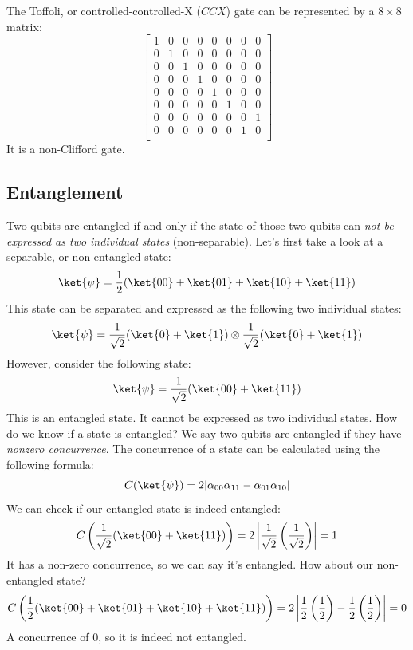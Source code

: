 \documentclass[11pt]{article}
\begin{document}
\newpage
\noindent
The Toffoli, or controlled-controlled-X ($CCX$) gate can be represented by a $8 \times 8$ matrix:
\[
  \begin{bmatrix}
  1 & 0 & 0 & 0 & 0 & 0 & 0 & 0\\
  0 & 1 & 0 & 0 & 0 & 0 & 0 & 0\\
  0 & 0 & 1 & 0 & 0 & 0 & 0 & 0\\
  0 & 0 & 0 & 1 & 0 & 0 & 0 & 0\\
  0 & 0 & 0 & 0 & 1 & 0 & 0 & 0\\
  0 & 0 & 0 & 0 & 0 & 1 & 0 & 0\\
  0 & 0 & 0 & 0 & 0 & 0 & 0 & 1\\
  0 & 0 & 0 & 0 & 0 & 0 & 1 & 0\\
  \end{bmatrix}
\]
It is a non-Clifford gate.

\subsection{Entanglement}
Two qubits are entangled if and only if the state of those two qubits can \emph{not be expressed as two individual states} (non-separable). Let's first take a look at a separable, or non-entangled state:
\[
  \ket{\psi} = \dfrac{1}{2}(\ket{00} + \ket{01} + \ket{10} + \ket{11})
\]
This state can be separated and expressed as the following two individual states:
\[
  \ket{\psi} = \dfrac{1}{\sqrt2}(\ket{0} + \ket{1}) \otimes \dfrac{1}{\sqrt2}(\ket{0} + \ket{1})
\]
However, consider the following state:
\[
  \ket{\psi} = \dfrac{1}{\sqrt2}(\ket{00} + \ket{11})
\]
This is an entangled state. It cannot be expressed as two individual states. How do we know if a state is entangled? We say two qubits are entangled if they have \emph{nonzero concurrence}. The concurrence of a state can be calculated using the following formula:
\[
  C(\ket{\psi}) = 2|\alpha_{00}\alpha_{11} - \alpha_{01}\alpha_{10}|
\]
We can check if our entangled state is indeed entangled:
\[
  C\left(\dfrac{1}{\sqrt2}(\ket{00} + \ket{11})\right) = 2\left|\dfrac{1}{\sqrt2}\left(\dfrac{1}{\sqrt2}\right)\right| = 1
\]
It has a non-zero concurrence, so we can say it's entangled. How about our non-entangled state?
\[
  C\left(\dfrac{1}{2}(\ket{00} + \ket{01} + \ket{10} + \ket{11})\right) = 2\left|\dfrac{1}{2}\left(\dfrac{1}{2}\right) - \dfrac{1}{2}\left(\dfrac{1}{2}\right)\right| = 0
\]
A concurrence of 0, so it is indeed not entangled.
\end{document}
